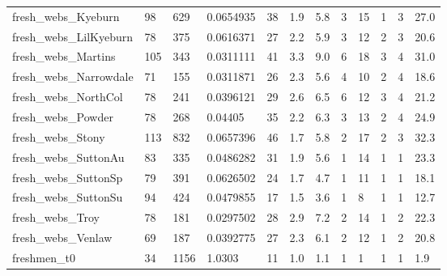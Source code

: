 \begin{longtable}{llllllllllll}
 fresh\_webs\_Kyeburn                                 & 98         & 629       & 0.0654935   & 38    & 1.9    & 5.8    & 3     & 15     & 1      & 3      & 27.0    \\
 fresh\_webs\_LilKyeburn                              & 78         & 375       & 0.0616371   & 27    & 2.2    & 5.9    & 3     & 12     & 2      & 3      & 20.6    \\
 fresh\_webs\_Martins                                 & 105        & 343       & 0.0311111   & 41    & 3.3    & 9.0    & 6     & 18     & 3      & 4      & 31.0    \\
 fresh\_webs\_Narrowdale                              & 71         & 155       & 0.0311871   & 26    & 2.3    & 5.6    & 4     & 10     & 2      & 4      & 18.6    \\
 fresh\_webs\_NorthCol                                & 78         & 241       & 0.0396121   & 29    & 2.6    & 6.5    & 6     & 12     & 3      & 4      & 21.2    \\
 fresh\_webs\_Powder                                  & 78         & 268       & 0.04405     & 35    & 2.2    & 6.3    & 3     & 13     & 2      & 4      & 24.9    \\
 fresh\_webs\_Stony                                   & 113        & 832       & 0.0657396   & 46    & 1.7    & 5.8    & 2     & 17     & 2      & 3      & 32.3    \\
 fresh\_webs\_SuttonAu                                & 83         & 335       & 0.0486282   & 31    & 1.9    & 5.6    & 1     & 14     & 1      & 1      & 23.3    \\
 fresh\_webs\_SuttonSp                                & 79         & 391       & 0.0626502   & 24    & 1.7    & 4.7    & 1     & 11     & 1      & 1      & 18.1    \\
 fresh\_webs\_SuttonSu                                & 94         & 424       & 0.0479855   & 17    & 1.5    & 3.6    & 1     & 8      & 1      & 1      & 12.7    \\
 fresh\_webs\_Troy                                    & 78         & 181       & 0.0297502   & 28    & 2.9    & 7.2    & 2     & 14     & 1      & 2      & 22.3    \\
 fresh\_webs\_Venlaw                                  & 69         & 187       & 0.0392775   & 27    & 2.3    & 6.1    & 2     & 12     & 1      & 2      & 20.8    \\
 freshmen\_t0                                        & 34         & 1156      & 1.0303      & 11    & 1.0    & 1.1    & 1     & 1      & 1      & 1      & 1.9     \\

\end{longtable}
